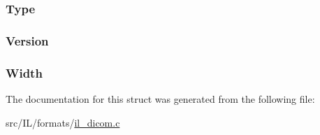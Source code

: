 \hypertarget{struct_d_i_c_o_m_h_e_a_d_a437e4fc3b579e2e7879dedd0fd2ac587}{
\subsubsection[{Type}]{ Type}}\label{struct_d_i_c_o_m_h_e_a_d_a437e4fc3b579e2e7879dedd0fd2ac587}
\hypertarget{struct_d_i_c_o_m_h_e_a_d_ace8731875025335038f754ff027b835a}{
\subsubsection[{Version}]{ Version}}\label{struct_d_i_c_o_m_h_e_a_d_ace8731875025335038f754ff027b835a}
\hypertarget{struct_d_i_c_o_m_h_e_a_d_a4146e7b2b0b4097e0e335f9b348392bf}{
\subsubsection[{Width}]{ Width}}\label{struct_d_i_c_o_m_h_e_a_d_a4146e7b2b0b4097e0e335f9b348392bf}


The documentation for this struct was generated from the following file\-:\begin{DoxyCompactItemize}
\item 
src/\-I\-L/formats/\hyperlink{il__dicom_8c}{il\-\_\-dicom.\-c}\end{DoxyCompactItemize}
